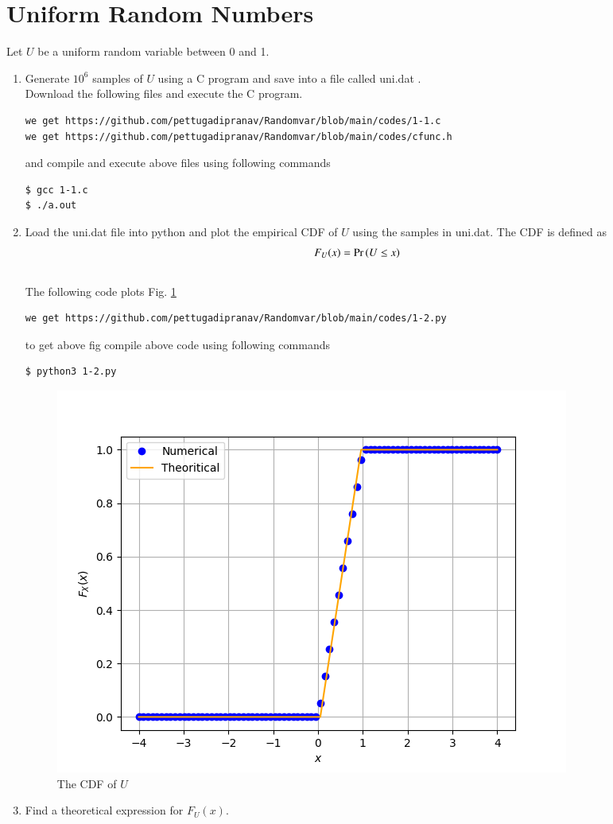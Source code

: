 \documentclass[journal,12pt,twocolumn]{IEEEtran}
\renewcommand\thesection{\arabic{section}}
\begin{document}
\section{Uniform Random Numbers}
Let $U$ be a uniform random variable between 0 and 1.
\begin{enumerate}[label=\thesection.\arabic*
,ref=\thesection.\theenumi]
\item Generate $10^6$ samples of $U$ using a C program and save into a file called uni.dat .
\\
\solution Download the following files and
execute the C program.
\begin{lstlisting}
we get https://github.com/pettugadipranav/Randomvar/blob/main/codes/1-1.c 
we get https://github.com/pettugadipranav/Randomvar/blob/main/codes/cfunc.h
\end{lstlisting}
and compile and execute above files using following commands
\begin{lstlisting}
$ gcc 1-1.c
$ ./a.out
\end{lstlisting}
\item
Load the uni.dat file into python and plot the empirical CDF of $U$ using the samples in uni.dat. The CDF is defined as
\begin{align}
F_{U}(x) = \Pr\left(U \le x\right)
\end{align}
\\
\solution  The following code plots Fig. \ref{fig:uni_cdf}
\begin{lstlisting}
we get https://github.com/pettugadipranav/Randomvar/blob/main/codes/1-2.py
\end{lstlisting}
to get above fig compile above code using following commands
\begin{lstlisting}
$ python3 1-2.py
\end{lstlisting}
\begin{figure}[!h]
\centering
\includegraphics[width=\columnwidth]{./figs/1-2}
\caption{The CDF of $U$}
\label{fig:uni_cdf}
\end{figure}
\item
Find a  theoretical expression for $F_{U}(x)$.\\
\solution\\


\end{enumerate}
\end{document}
